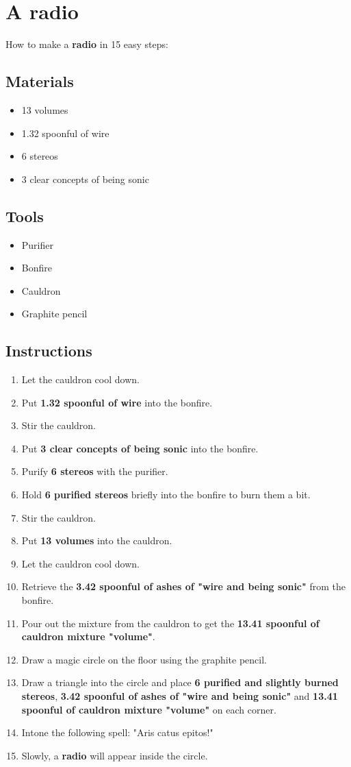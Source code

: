 \documentclass{article}
\begin{document}
\section{A radio}How to make a \textbf{radio} in 15 easy steps:

\subsection{Materials}\begin{itemize}
\item 
13 volumes
\item 
1.32 spoonful of wire
\item 
6 stereos
\item 
3 clear concepts of being sonic
\end{itemize}
\subsection{Tools}\begin{itemize}
\item 
Purifier
\item 
Bonfire
\item 
Cauldron
\item 
Graphite pencil
\end{itemize}
\subsection{Instructions}\begin{enumerate}
\item 
Let the cauldron cool down.
\item 
Put \textbf{1.32 spoonful of wire} into the bonfire.
\item 
Stir the cauldron.
\item 
Put \textbf{3 clear concepts of being sonic} into the bonfire.
\item 
Purify \textbf{6 stereos} with the purifier.
\item 
Hold \textbf{6 purified stereos} briefly into the bonfire to burn them a bit.
\item 
Stir the cauldron.
\item 
Put \textbf{13 volumes} into the cauldron.
\item 
Let the cauldron cool down.
\item 
Retrieve the \textbf{3.42 spoonful of ashes of "wire and being sonic"} from the bonfire.
\item 
Pour out the mixture from the cauldron to get the \textbf{13.41 spoonful of cauldron mixture "volume"}.
\item 
Draw a magic circle on the floor using the graphite pencil.
\item 
Draw a triangle into the circle and place \textbf{6 purified and slightly burned stereos}, \textbf{3.42 spoonful of ashes of "wire and being sonic"} and \textbf{13.41 spoonful of cauldron mixture "volume"} on each corner.
\item 
Intone the following spell: "Aris catus epitos!"
\item 
Slowly, a \textbf{radio} will appear inside the circle.
\end{enumerate}
\newpage
\end{document}
